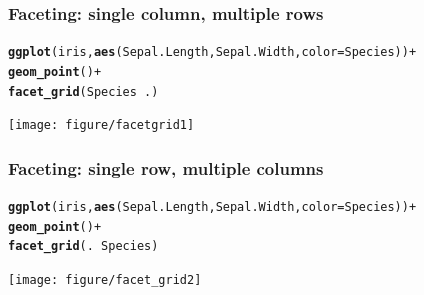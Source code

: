 \documentclass{beamer}\usepackage[]{graphicx}\usepackage[]{color}
\makeatletter
\newcommand{\hlopt}[1]{\textcolor[rgb]{0,0,0}{#1}}%
\newcommand{\hlstd}[1]{\textcolor[rgb]{0.345,0.345,0.345}{#1}}%
\newcommand{\hlkwc}[1]{\textcolor[rgb]{0.333,0.667,0.333}{#1}}%
\newcommand{\hlkwd}[1]{\textcolor[rgb]{0.737,0.353,0.396}{\textbf{#1}}}%
\newenvironment{kframe}{%
 \def\at@end@of@kframe{}%
 \ifinner\ifhmode%
  \def\at@end@of@kframe{\end{minipage}}%
  \begin{minipage}{\columnwidth}%
 \fi\fi%
 \def\FrameCommand##1{\hskip\@totalleftmargin \hskip-\fboxsep
 \colorbox{shadecolor}{##1}\hskip-\fboxsep
     \hskip-\linewidth \hskip-\@totalleftmargin \hskip\columnwidth}%
 \MakeFramed {\advance\hsize-\width
   \@totalleftmargin\z@ \linewidth\hsize
   \@setminipage}}%
 {\par\unskip\endMakeFramed%
 \at@end@of@kframe}
\newenvironment{knitrout}{}{} %
\makeatother
\begin{document}

\begin{frame}[fragile]
\frametitle{Faceting: single column, multiple rows}
\begin{knitrout}\footnotesize
{}\color{fgcolor}\begin{kframe}
\begin{alltt}
\hlkwd{ggplot}\hlstd{(iris,} \hlkwd{aes}\hlstd{(Sepal.Length, Sepal.Width,} \hlkwc{color} \hlstd{= Species))} \hlopt{+}
\hlkwd{geom_point}\hlstd{()} \hlopt{+}
\hlkwd{facet_grid}\hlstd{(Species} \hlopt{~} \hlstd{.)}
\end{alltt}
\end{kframe}

{\centering \texttt{[image: figure/facetgrid1]} 

}



\end{knitrout}
\end{frame}


\begin{frame}[fragile]
\frametitle{Faceting: single row, multiple columns}
\begin{knitrout}\footnotesize
{}\color{fgcolor}\begin{kframe}
\begin{alltt}
\hlkwd{ggplot}\hlstd{(iris,} \hlkwd{aes}\hlstd{(Sepal.Length, Sepal.Width,} \hlkwc{color} \hlstd{= Species))} \hlopt{+}
\hlkwd{geom_point}\hlstd{()} \hlopt{+}
\hlkwd{facet_grid}\hlstd{(.} \hlopt{~} \hlstd{Species)}
\end{alltt}
\end{kframe}

{\centering \texttt{[image: figure/facet\_grid2]} 

}



\end{knitrout}
\end{frame}

\end{document}
